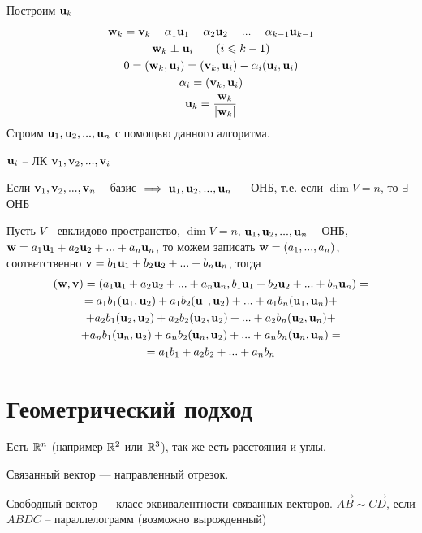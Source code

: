 \documentclass[main]{subfiles}
\begin{document}
Построим $\mathbf{u}_k$
\begin{gather*}
    \mathbf{w}_k = \mathbf{v}_k - \alpha_1 \mathbf{u}_1 - \alpha_2 \mathbf{u}_2 - ... - \alpha_{k-1} \mathbf{u}_{k-1}\\
    \mathbf{w}_k \perp \mathbf{u}_i \qquad (i \leqslant k-1)\\
    0 = (\mathbf{w}_k, \mathbf{u}_i) = (\mathbf{v}_k, \mathbf{u}_i) - \alpha_i (\mathbf{u}_i, \mathbf{u}_i)\\
    \alpha_i = (\mathbf{v}_k, \mathbf{u}_i)\\
    \mathbf{u}_k = \frac{\mathbf{w}_k}{|\mathbf{w}_k|}
\end{gather*}
Строим $\mathbf{u}_1, \mathbf{u}_2, ..., \mathbf{u}_n$ с помощью данного алгоритма.
\begin{remark}
    $\mathbf{u}_i$ -- ЛК $\mathbf{v}_1, \mathbf{v}_2, ..., \mathbf{v}_i$
\end{remark}

\begin{corollary}
    Если $\mathbf{v}_1, \mathbf{v}_2, ..., \mathbf{v}_n$ -- базис $\implies \mathbf{u}_1, \mathbf{u}_2, ..., \mathbf{u}_n$ --- ОНБ,
    т.е. если $\dim V = n$, то  $\exists$ ОНБ
\end{corollary}

Пусть $V$ - евклидово пространство, $\dim V =n$, $\mathbf{u}_1, \mathbf{u}_2, ..., \mathbf{u}_n$ -- ОНБ,
$\mathbf{w} = a_1 \mathbf{u}_1 +a_2 \mathbf{u}_2 + ... + a_n \mathbf{u}_n$, то можем записать $\mathbf{w} = (a_1, ..., a_n)$,
соответственно $\mathbf{v} = b_1 \mathbf{u}_1 + b_2 \mathbf{u}_2 + ... + b_n \mathbf{u}_n$, тогда
\begin{multline*}
    (\mathbf{w}, \mathbf{v}) = (a_1 \mathbf{u}_1 + a_2 \mathbf{u}_2 + ... + a_n \mathbf{u}_n, b_1 \mathbf{u}_1 + b_2 \mathbf{u}_2 + ... + b_n \mathbf{u}_n) = \\
    = a_1 b_1 (\mathbf{u}_1, \mathbf{u}_2) + a_1 b_2 (\mathbf{u}_1, \mathbf{u}_2) + ... + a_1 b_n (\mathbf{u}_1, \mathbf{u}_n)+\\
    + a_2 b_1 (\mathbf{u}_2, \mathbf{u}_2) + a_2 b_2 (\mathbf{u}_2, \mathbf{u}_2) + ... + a_2 b_n (\mathbf{u}_2, \mathbf{u}_n)+\\
    + a_n b_1 (\mathbf{u}_n, \mathbf{u}_2) + a_n b_2 (\mathbf{u}_n, \mathbf{u}_2) + ... + a_n b_n (\mathbf{u}_n, \mathbf{u}_n)=\\
    = a_1 b_1 + a_2 b_2 + ... + a_n b_n
\end{multline*}

\section{Геометрический подход}
Есть $\mathbb{R}^n$ (например $\mathbb{R}^2$ или $\mathbb{R}^3$), так же есть расстояния и углы.

\begin{definition}
    Связанный вектор --- направленный отрезок.
\end{definition}
\begin{definition}
    Свободный вектор --- класс эквивалентности связанных векторов.
    $\overrightarrow{AB} \sim \overrightarrow{CD}$, если $ABDC$ -- параллелограмм
    (возможно вырожденный)
\end{definition}
\end{document}
